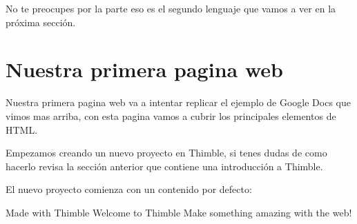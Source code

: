 \documentclass[letterpaper,10pt,spanish]{sphinxmanual}
\begin{document}
No te preocupes por la parte  eso es el segundo lenguaje que vamos a ver en la próxima sección.


\section{Nuestra primera pagina web}
\label{\detokenize{html:nuestra-primera-pagina-web}}
Nuestra primera pagina web va a intentar replicar el ejemplo de Google Docs que
vimos mas arriba, con esta pagina vamos a cubrir los principales elementos de
HTML.

Empezamos creando un nuevo proyecto en Thimble, si tenes dudas de como hacerlo
revisa la sección anterior que contiene una introducción a Thimble.

El nuevo proyecto comienza con un contenido por defecto:

%
\begin{sphinxVerbatim}[commandchars=\\\{\}]
         
          
        Made with Thimble
          
        Welcome to Thimble
          Make something amazing with the web!
\end{sphinxVerbatim}
\end{document}
